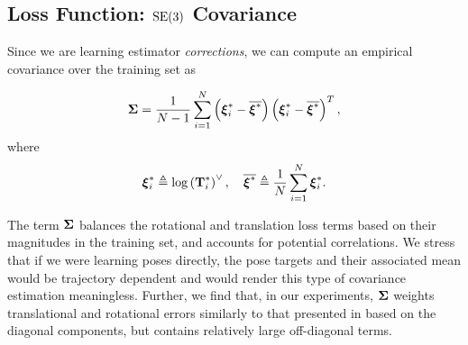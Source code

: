 \subsection{Loss Function: $\mathrm{SE}(3)$ Covariance}

Since we are learning estimator \textit{corrections}, we can compute an empirical covariance over the training set as

\begin{equation}
\boldsymbol{\mathbf{\Sigma}} = \frac{1}{N-1} \sum_{i=1}^{N} \left( \boldsymbol{\mathbf{\xi}}^*_i -\overline{\boldsymbol{\mathbf{\xi}}^*} \right) \left( \boldsymbol{\mathbf{\xi}}^*_i -\overline{\boldsymbol{\mathbf{\xi}}^*} \right)^T,
\end{equation}
where 
\begin{equation}
	\boldsymbol{\mathbf{\xi}}^*_i \triangleq \mathrm{log}\left({\boldsymbol{\mathbf{T}}^*_i}\right)^{\vee}, \quad \overline{\boldsymbol{\mathbf{\xi}}^*} \triangleq \frac{1}{N} \sum_{i=1}^N \boldsymbol{\mathbf{\xi}}^*_i.
\end{equation}

The term $\boldsymbol{\mathbf{\Sigma}}$ balances the rotational and translation loss terms based on their magnitudes in the training set, and accounts for potential correlations. We stress that if we were learning poses directly, the pose targets and their associated mean would be trajectory dependent and would render this type of covariance estimation meaningless. Further, we find that, in our experiments, $\boldsymbol{\mathbf{\Sigma}}$ weights translational and rotational errors similarly to that presented in \cite{Kendall2017-u} %
 based on the diagonal components, but contains relatively large off-diagonal terms.

